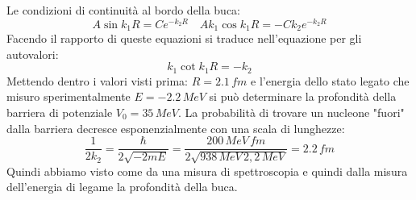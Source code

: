 Le condizioni di continuità al bordo della buca:
\begin{equation*}
    A\sin{k_1R}=Ce^{-k_2R} \quad  Ak_1\cos{k_1R}=-Ck_2e^{-k_2R}
\end{equation*}
Facendo il rapporto di queste equazioni si traduce nell'equazione per gli autovalori:
\begin{equation*}
    k_1\cot{k_1R}=-k_2
\end{equation*}
Mettendo dentro i valori visti prima: $R=2.1\,fm$ e l'energia dello stato legato che misuro sperimentalmente $E=-2.2\,MeV$ si può determinare la profondità della barriera di potenziale $V_0=35\,MeV$. La probabilità di trovare un nucleone "fuori" dalla barriera decresce esponenzialmente con una scala di lunghezze:
\begin{equation*}
    \frac{1}{2k_2}=\frac{\hbar}{2\sqrt{-2mE}}=\frac{200\,MeV\,fm}{2\sqrt{938\,MeV\,2,2\,MeV}}=2.2\,fm
\end{equation*}
Quindi abbiamo visto come da una misura di spettroscopia e quindi dalla misura dell'energia di legame la profondità della buca.
